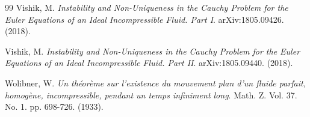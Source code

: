 \begin{thebibliography}{99}
Vishik, M.
\textit{Instability and Non-Uniqueness in the Cauchy Problem for the Euler Equations
of an Ideal Incompressible Fluid. Part I}.
arXiv:1805.09426. (2018).

Vishik, M.
\textit{Instability and Non-Uniqueness in the Cauchy Problem for the Euler Equations
of an Ideal Incompressible Fluid. Part II}.
arXiv:1805.09440. (2018).

Wolibner, W.
\textit{Un th\'eor\`eme sur l'existence du mouvement plan d'un fluide parfait,
homog\`ene, incompressible, pendant un temps infiniment long}.
Math. Z. Vol. 37. No. 1. pp. 698-726. (1933).

\end{thebibliography}
